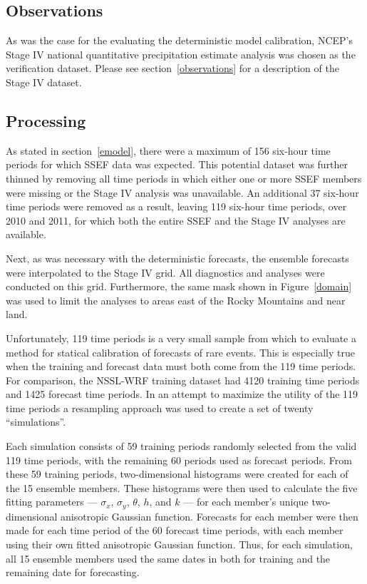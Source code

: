\subsection{Observations}
\label{eobservations}

As was the case for the evaluating the deterministic model calibration, NCEP's Stage IV national quantitative precipitation estimate analysis was chosen as the verification dataset.
Please see \mbox{section \ref{observations}} for a description of the Stage IV dataset.




\subsection{Processing}
\label{eprocessing}

As stated in \mbox{section \ref{emodel}}, there were a maximum of 156 six-hour time periods for which SSEF data was expected.
This potential dataset was further thinned by removing all time periods in which either one or more SSEF members were missing or the Stage IV analysis was unavailable.
An additional 37 six-hour time periods were removed as a result, leaving 119 six-hour time periods, over 2010 and 2011, for which both the entire SSEF and the Stage IV analyses are available.


Next, as was necessary with the deterministic forecasts, the ensemble forecasts were interpolated to the Stage IV grid.
All diagnostics and analyses were conducted on this grid.
Furthermore, the same mask shown in \mbox{Figure \ref{domain}} was used to limit the analyses to areas east of the Rocky Mountains and near land.


Unfortunately, 119 time periods is a very small sample from which to evaluate a method for statical calibration of forecasts of rare events.
This is especially true when the training and forecast data must both come from the 119 time periods.
For comparison, the NSSL-WRF training dataset had 4120 training time periods and 1425 forecast time periods.
In an attempt to maximize the utility of the 119 time periods a resampling approach was used to create a set of twenty ``simulations''.


Each simulation consists of 59 training periods randomly selected from the valid 119 time periods, with the remaining 60 periods used as forecast periods.
From these 59 training periods, two-dimensional histograms were created for each of the 15 ensemble members.
These histograms were then used to calculate the five fitting parameters --- $\sigma_x$, $\sigma_y$, $\theta$, $h$, and $k$ --- for each member's unique two-dimensional anisotropic Gaussian function.
Forecasts for each member were then made for each time period of the 60 forecast time periods, with each member using their own fitted anisotropic Gaussian function.
Thus, for each simulation, all 15 ensemble members used the same dates in both for training and the remaining date for forecasting.






